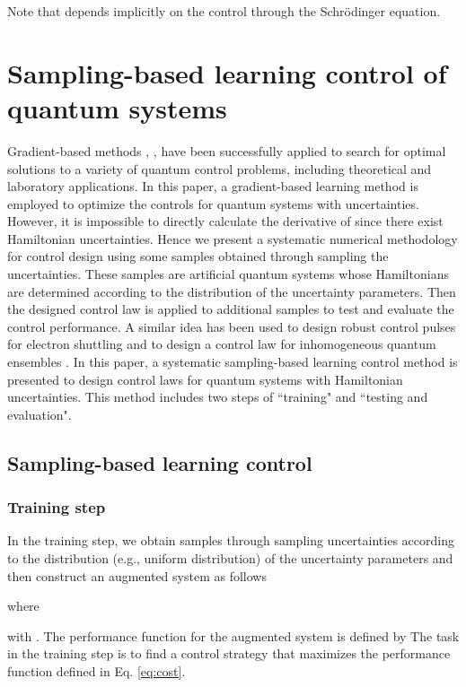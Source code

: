 \documentclass[letterpaper, 10 pt, conference]{ieeeconf}
\begin{document}
Note that  depends implicitly on the control
 through the Schr\"odinger equation.

\section{Sampling-based learning control of quantum systems}\label{Sec3}
Gradient-based methods \cite{Brif et al 2010}, \cite{Long and Rabitz
2011}, \cite{Roslund and Rabitz 2009}
have been successfully applied to search for optimal solutions to a
variety of quantum control problems, including theoretical and
laboratory applications. In this paper, a gradient-based learning
method is employed to optimize the controls for quantum systems with uncertainties. However, it is impossible to directly calculate
the derivative of  since there exist Hamiltonian uncertainties. Hence
we present a systematic numerical methodology for control design
using some samples obtained through sampling the uncertainties.
These samples are artificial quantum systems whose Hamiltonians are determined
according to the distribution of the uncertainty parameters. Then the
designed control law is applied to additional samples to test and
evaluate the control performance. A similar idea has been used to design robust control pulses for electron shuttling \cite{Zhang et al 2012} and to design a control law for inhomogeneous quantum ensembles \cite{Chen et al 2013arXiv}. In this paper, a systematic sampling-based learning control method is
presented to design control laws for quantum systems with Hamiltonian uncertainties. This method includes two steps of
``training" and ``testing and evaluation".


\subsection{Sampling-based learning control}

\subsubsection{Training step}\label{sec:training}
In the training step, we obtain  samples through sampling uncertainties according to the distribution (e.g., uniform
distribution) of the uncertainty parameters and then construct an
augmented system as follows

where

with . The performance function for the augmented
system is defined by
 The task in the training step is to find a control
strategy 
that maximizes the performance function defined in Eq.
\eqref{eq:cost}.
\end{document}
